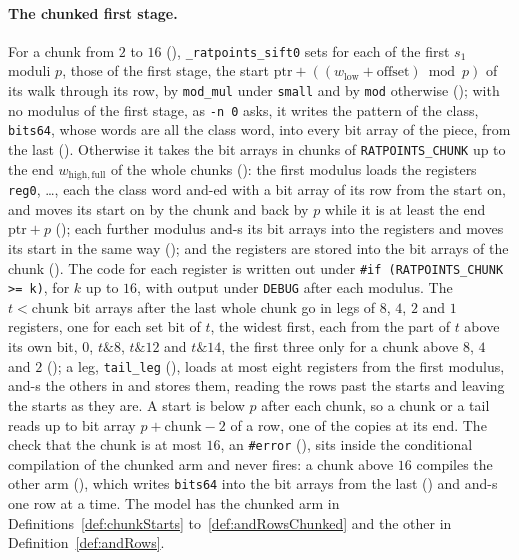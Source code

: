 \paragraph{The chunked first stage.} For a chunk from $2$ to $16$ (),
\verb|_ratpoints_sift0| sets for each of the first $s_1$ moduli $p$, those of the first stage, the
start $\mathrm{ptr} + ((w_{\mathrm{low}} + \mathrm{offset}) \bmod p)$ of its walk through its row,
by \verb|mod_mul| under \verb|small| and by \verb|mod| otherwise (); with
no modulus of the first stage, as \verb|-n 0| asks, it writes the pattern of the class,
\verb|bits64|, whose words are all the class word, into every bit array of the piece, from the last
(). Otherwise it takes the bit arrays in chunks of \verb|RATPOINTS_CHUNK|
up to the end $w_{\mathrm{high,full}}$ of the whole chunks (): the first
modulus loads the registers \verb|reg0|, \dots, each the class word and-ed with a bit array of its
row from the start on, and moves its start on by the chunk and back by $p$ while it is at least the
end $\mathrm{ptr} + p$ (); each further modulus and-s its bit arrays into
the registers and moves its start in the same way (); and the registers
are stored into the bit arrays of the chunk (). The code for each register
is written out under \verb|#if (RATPOINTS_CHUNK >= k)|, for $k$ up to $16$, with output under
\verb|DEBUG| after each modulus. The $t < \mathrm{chunk}$ bit arrays after the last whole chunk go
in legs of $8$, $4$, $2$ and $1$ registers, one for each set bit of $t$, the widest first, each from
the part of $t$ above its own bit, $0$, $t \mathbin{\&} 8$, $t \mathbin{\&} 12$ and $t \mathbin{\&}
14$, the first three only for a chunk above $8$, $4$ and $2$ (); a leg,
\verb|tail_leg| (), loads at most eight registers from the first modulus,
and-s the others in and stores them, reading the rows past the starts and leaving the starts as they
are. A start is below $p$ after each chunk, so a chunk or a tail reads up to bit array $p +
\mathrm{chunk} - 2$ of a row, one of the copies at its end. The check that the chunk is at most
$16$, an \verb|#error| (), sits inside the conditional compilation of the
chunked arm and never fires: a chunk above $16$ compiles the other arm
(), which writes \verb|bits64| into the bit arrays from the last
() and and-s one row at a time. The model has the chunked arm in
Definitions~\ref{def:chunkStarts} to~\ref{def:andRowsChunked} and the other in
Definition~\ref{def:andRows}.

